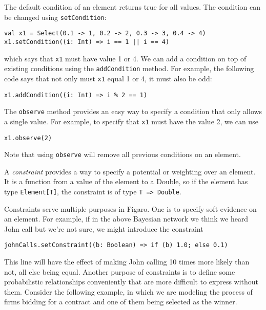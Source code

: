 The default condition of an element returns true for all values. The condition can be changed using \texttt{setCondition}:

\begin{flushleft}
\texttt{val x1 = Select(0.1 -> 1, 0.2 -> 2, 0.3 -> 3, 0.4 -> 4)
x1.setCondition((i: Int) => i == 1 || i == 4)}
\end{flushleft}

which says that \texttt{x1} must have value 1 or 4. We can add a condition on top of existing conditions using the \texttt{addCondition} method. For example, the following code says that not only must \texttt{x1} equal 1 or 4, it must also be odd:

\begin{flushleft}
\texttt{x1.addCondition((i: Int) => i \% 2 == 1)}
\end{flushleft}

The \texttt{observe} method provides an easy way to specify a condition that only allows a single value. For example, to specify that \texttt{x1} must have the value 2, we can use

\begin{flushleft}
\texttt{x1.observe(2)}
\end{flushleft}

Note that using \texttt{observe} will remove all previous conditions on an element.

A \emph{constraint} provides a way to specify a potential or weighting over an element. It is a function from a value of the element to a Double, so if the element has type \texttt{Element[T]}, the constraint is of type \texttt{T => Double}.

Constraints serve multiple purposes in Figaro. One is to specify soft evidence on an element. For example, if in the above Bayesian network we think we heard John call but we're not sure, we might introduce the constraint

\begin{flushleft}
\texttt{johnCalls.setConstraint((b: Boolean) => 
\newline \tab if (b) 1.0; else 0.1)}
\end{flushleft}

This line will have the effect of making John calling 10 times more likely than not, all else being equal. Another purpose of constraints is to define some probabilistic relationships conveniently that are more difficult to express without them. Consider the following example, in which we are modeling the process of firms bidding for a contract and one of them being selected as the winner.

